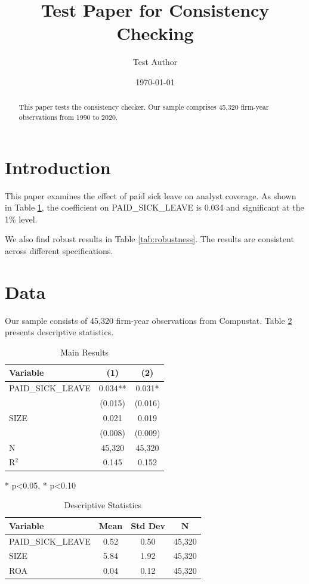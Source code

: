 \documentclass[12pt]{article}
\title{Test Paper for Consistency Checking}
\author{Test Author}
\date{\today}
\begin{document}
\maketitle

\begin{abstract}
This paper tests the consistency checker. Our sample comprises 45,320 firm-year observations from 1990 to 2020.
\end{abstract}

\section{Introduction}
\label{sec:intro}

This paper examines the effect of paid sick leave on analyst coverage. As shown in Table \ref{tab:main_results}, the coefficient on PAID\_SICK\_LEAVE is 0.034 and significant at the 1\% level.

We also find robust results in Table \ref{tab:robustness}. The results are consistent across different specifications.

\section{Data}
\label{sec:data}

Our sample consists of 45,320 firm-year observations from Compustat. Table \ref{tab:descriptive} presents descriptive statistics.

\begin{table}[htbp]
\centering
\caption{Main Results}
\label{tab:main_results}
\begin{tabular}{lcc}
\hline
Variable & (1) & (2) \\
\hline
PAID\_SICK\_LEAVE & 0.034** & 0.031* \\
 & (0.015) & (0.016) \\
SIZE & 0.021 & 0.019 \\
 & (0.008) & (0.009) \\
\hline
N & 45,320 & 45,320 \\
R$^2$ & 0.145 & 0.152 \\
\hline
\end{tabular}
\begin{tablenotes}
\small
\item ** p<0.05, * p<0.10
\end{tablenotes}
\end{table}

\begin{table}[htbp]
\centering
\caption{Descriptive Statistics}
\label{tab:descriptive}
\begin{tabular}{lccc}
\hline
Variable & Mean & Std Dev & N \\
\hline
PAID\_SICK\_LEAVE & 0.52 & 0.50 & 45,320 \\
SIZE & 5.84 & 1.92 & 45,320 \\
ROA & 0.04 & 0.12 & 45,320 \\
\hline
\end{tabular}
\end{table}
\end{document}
